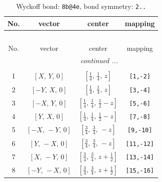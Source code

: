 \documentclass[fleqn,8pt]{jsarticle}
\begin{document}
\begin{longtable}{cccc}
\caption{Wyckoff bond: {\tt 8b@4e}, bond symmetry: {\tt 2..}}
 \\
 \hline \hline
No. & vector & center & mapping \\ \hline \endfirsthead

\multicolumn{3}{l}{\tablename\ \thetable{}} \\
 \hline \hline
No. & vector & center & mapping \\ \hline \endhead

 \hline \hline
\multicolumn{3}{r}{\footnotesize\it continued ...} \\ \endfoot

 \hline \hline
\multicolumn{3}{r}{} \\ \endlastfoot

1 & $\left[ X,\, Y,\, 0 \right]$ & $\left[ \frac{1}{4},\, \frac{1}{4},\, z \right]$ & {\tt [1,-2]} \\ \hline
2 & $\left[ - Y,\, X,\, 0 \right]$ & $\left[ \frac{1}{4},\, \frac{1}{4},\, z \right]$ & {\tt [3,-4]} \\ \hline
3 & $\left[ - X,\, Y,\, 0 \right]$ & $\left[ \frac{1}{4},\, \frac{1}{4},\, \frac{1}{2} - z \right]$ & {\tt [5,-6]} \\ \hline
4 & $\left[ Y,\, X,\, 0 \right]$ & $\left[ \frac{1}{4},\, \frac{1}{4},\, \frac{1}{2} - z \right]$ & {\tt [7,-8]} \\ \hline
5 & $\left[ - X,\, - Y,\, 0 \right]$ & $\left[ \frac{3}{4},\, \frac{3}{4},\, - z \right]$ & {\tt [9,-10]} \\ \hline
6 & $\left[ Y,\, - X,\, 0 \right]$ & $\left[ \frac{3}{4},\, \frac{3}{4},\, - z \right]$ & {\tt [11,-12]} \\ \hline
7 & $\left[ X,\, - Y,\, 0 \right]$ & $\left[ \frac{3}{4},\, \frac{3}{4},\, z + \frac{1}{2} \right]$ & {\tt [13,-14]} \\ \hline
8 & $\left[ - Y,\, - X,\, 0 \right]$ & $\left[ \frac{3}{4},\, \frac{3}{4},\, z + \frac{1}{2} \right]$ & {\tt [15,-16]} \\
\end{longtable}
\renewcommand{\arraystretch}{1.2}
\end{document}
